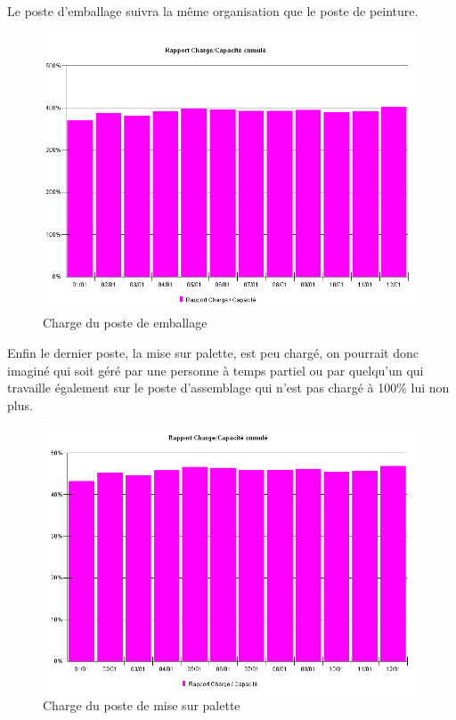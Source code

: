 \documentclass[a4paper]{TPInsa}
\begin{document}
	Le poste d'emballage suivra la même organisation que le poste de peinture. 
	\begin{figure}[H]
	\centering
	\includegraphics[scale=0.6]{captures/charge_emb.PNG}
	\caption{Charge du poste de emballage}
	\end{figure}
	
	Enfin le dernier poste, la mise sur palette, est peu chargé, on pourrait donc imaginé qui soit géré par une personne à temps partiel ou par quelqu'un qui travaille également sur le poste d'assemblage qui n'est pas chargé à 100\% lui non plus.
	\begin{figure}[H]
	\centering
	\includegraphics[scale=0.6]{captures/charge_pal.PNG}
	\caption{Charge du poste de mise sur palette}
	\end{figure}
\end{document}

